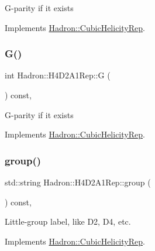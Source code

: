 G-\/parity if it exists 

Implements \mbox{\hyperlink{structHadron_1_1CubicHelicityRep_a50689f42be1e6170aa8cf6ad0597018b}{Hadron\+::\+Cubic\+Helicity\+Rep}}.

\mbox{\label{structHadron_1_1H4D2A1Rep_adf7afdc418ccacac0b436a1edc71c4be}} 
\subsubsection{\texorpdfstring{G()}{G()}\hspace{0.1cm}{\footnotesize\ttfamily [2/2]}}
{\footnotesize\ttfamily int Hadron\+::\+H4\+D2\+A1\+Rep\+::G (\begin{DoxyParamCaption}{ }\end{DoxyParamCaption}) const\hspace{0.3cm}{\ttfamily [inline]}, {\ttfamily [virtual]}}

G-\/parity if it exists 

Implements \mbox{\hyperlink{structHadron_1_1CubicHelicityRep_a50689f42be1e6170aa8cf6ad0597018b}{Hadron\+::\+Cubic\+Helicity\+Rep}}.

\mbox{\label{structHadron_1_1H4D2A1Rep_a08935df457743813b4a774db746d4b54}} 
\subsubsection{\texorpdfstring{group()}{group()}\hspace{0.1cm}{\footnotesize\ttfamily [1/3]}}
{\footnotesize\ttfamily std\+::string Hadron\+::\+H4\+D2\+A1\+Rep\+::group (\begin{DoxyParamCaption}{ }\end{DoxyParamCaption}) const\hspace{0.3cm}{\ttfamily [inline]}, {\ttfamily [virtual]}}

Little-\/group label, like D2, D4, etc. 

Implements \mbox{\hyperlink{structHadron_1_1CubicHelicityRep_a101a7d76cd8ccdad0f272db44b766113}{Hadron\+::\+Cubic\+Helicity\+Rep}}.

\mbox{\label{structHadron_1_1H4D2A1Rep_a08935df457743813b4a774db746d4b54}} 
